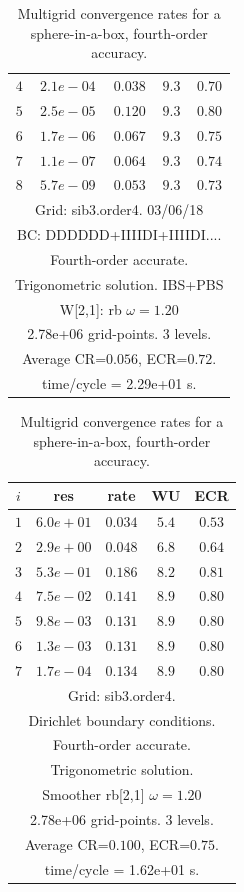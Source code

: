 \begin{table}[hbt]
\begin{center}
{\begin{tabular}{|c|c|c|c|c|}
 $ 4$  & $ 2.1e-04$ & $0.038$ & $ 9.3$ & $0.70$ \\ 
 $ 5$  & $ 2.5e-05$ & $0.120$ & $ 9.3$ & $0.80$ \\ 
 $ 6$  & $ 1.7e-06$ & $0.067$ & $ 9.3$ & $0.75$ \\ 
 $ 7$  & $ 1.1e-07$ & $0.064$ & $ 9.3$ & $0.74$ \\ 
 $ 8$  & $ 5.7e-09$ & $0.053$ & $ 9.3$ & $0.73$ \\ 
\hline 
\multicolumn{5}{|c|}{Grid: sib3.order4. 03/06/18}  \\
\multicolumn{5}{|c|}{BC: DDDDDD+IIIIDI+IIIIDI....}  \\
\multicolumn{5}{|c|}{Fourth-order accurate.}  \\
\multicolumn{5}{|c|}{Trigonometric solution. IBS+PBS}  \\
\multicolumn{5}{|c|}{W[2,1]: rb $\omega=1.20$}  \\
\multicolumn{5}{|c|}{2.78e+06 grid-points. 3 levels.}  \\
\multicolumn{5}{|c|}{Average CR=$0.056$, ECR=$0.72$.}  \\
\multicolumn{5}{|c|}{time/cycle = 2.29e+01 s.}  \\
\hline 
\end{tabular}
\begin{tabular}{|c|c|c|c|c|} \hline 
 $i$   & res      & rate    &  WU    & ECR  \\   \hline 
 $ 1$  & $ 6.0e+01$ & $0.034$ & $ 5.4$ & $0.53$ \\ 
 $ 2$  & $ 2.9e+00$ & $0.048$ & $ 6.8$ & $0.64$ \\ 
 $ 3$  & $ 5.3e-01$ & $0.186$ & $ 8.2$ & $0.81$ \\ 
 $ 4$  & $ 7.5e-02$ & $0.141$ & $ 8.9$ & $0.80$ \\ 
 $ 5$  & $ 9.8e-03$ & $0.131$ & $ 8.9$ & $0.80$ \\ 
 $ 6$  & $ 1.3e-03$ & $0.131$ & $ 8.9$ & $0.80$ \\ 
 $ 7$  & $ 1.7e-04$ & $0.134$ & $ 8.9$ & $0.80$ \\ 
\hline 
\multicolumn{5}{|c|}{Grid: sib3.order4.}  \\
\multicolumn{5}{|c|}{Dirichlet boundary conditions.}  \\
\multicolumn{5}{|c|}{Fourth-order accurate.}  \\
\multicolumn{5}{|c|}{Trigonometric solution.}  \\
\multicolumn{5}{|c|}{Smoother rb[2,1] $\omega=1.20$}  \\
\multicolumn{5}{|c|}{2.78e+06 grid-points. 3 levels.}  \\
\multicolumn{5}{|c|}{Average CR=$0.100$, ECR=$0.75$.}  \\
\multicolumn{5}{|c|}{time/cycle = 1.62e+01 s.}  \\
\hline 
\end{tabular}
} %
\end{center}
\caption{Multigrid convergence rates for a sphere-in-a-box, fourth-order accuracy.}
\label{fig:sibII}
\end{table}


